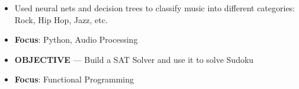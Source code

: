\documentclass[10pt,a4paper]{altacv}
\begin{document}

\begin{itemize}
	\item Used neural nets and decision trees to classify music into different categories: Rock, Hip Hop, Jazz, etc.
	\item \textbf{Focus}: Python, Audio Processing
\end{itemize}


%

\begin{itemize}
	\item \textbf{OBJECTIVE} --- Build a SAT Solver and use it to solve Sudoku
	\item \textbf{Focus}: Functional Programming
\end{itemize}
\end{document}
